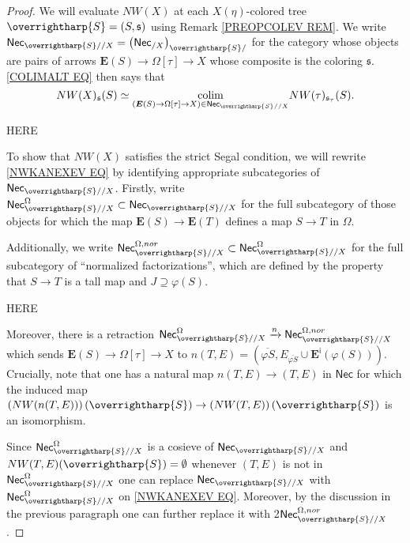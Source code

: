 \documentclass[a4paper,10pt
,draft
]{article}%
\numberwithin{equation}{section}
\numberwithin{figure}{section}
\theoremstyle{definition} %
\newcommand{\vect}[1]{\text{\overrightharp{\ensuremath{#1}}}}
\DeclareMathOperator{\colim}{colim}%
\newcommand{\1}{\ensuremath{\mathbbm 1}}%
\begin{document}
\begin{proof}
	We will evaluate 
	$NW(X)$ at each $X(\eta)$-colored tree
	$\vect{S}=(S,\mathfrak{s})$
	using Remark \ref{PREOPCOLEV REM}.
%	
	We write
	$\mathsf{Nec}_{\vect{S}//X}
	=
	\left(\mathsf{Nec}_{/X}\right)_{\vect{S}/}$
	for the category
	whose objects are pairs of arrows
	$\boldsymbol{E}(S) \to \Omega[\tau] \to X$
	whose composite is the coloring $\mathfrak{s}$.
	\eqref{COLIMALT EQ}
	then says that
\begin{equation}\label{NWKANEXEV EQ}
	NW(X)_{\mathfrak{s}}(S) 
	\simeq
	\underset{(\boldsymbol{E}(S) \to \Omega[\tau] \to X)
		\in \mathsf{Nec}_{\vect{S}//X}}{\colim}
	NW(\tau)_{\mathfrak{s}_{\tau}}(S).
\end{equation}

{\color{red} HERE}

	To show that $NW(X)$ satisfies the strict Segal condition, 
	we will rewrite \eqref{NWKANEXEV EQ} 
	by identifying appropriate subcategories of
	$\mathsf{Nec}_{\vect{S}//X}$.
	Firstly, write
	$\mathsf{Nec}_{\vect{S}//X}^{\Omega}
	\subset
	\mathsf{Nec}_{\vect{S}//X}$
	for the full subcategory of those objects for which the map
	$\boldsymbol{E}(S) \to \boldsymbol{E}(T)$
	defines a map $S \to T$ in $\Omega$.
	
	
	Additionally, we write 
	$
	\mathsf{Nec}_{\vect{S}//X}^{\Omega,nor}
	\subset
	\mathsf{Nec}_{\vect{S}//X}^{\Omega}
	$
	for the full subcategory of ``normalized factorizations'',
	which are defined by the property that
	$S \to T$ is a tall map and
	$J \supseteq \varphi(S)$.
	
{\color{red} HERE}	
	
	Moreover, there is a retraction
	$
	\mathsf{Nec}_{\vect{S}//X}^{\Omega}
	\xrightarrow{n}
	\mathsf{Nec}_{\vect{S}//X}^{\Omega,nor}
	$
	which sends
	$\boldsymbol{E}(S) \to \Omega[\tau] \to X$ to
	$n(T,E)=(\overline{\varphi S},
	E_{\overline{\varphi S}} \cup \boldsymbol{E}^{\mathsf{i}}(\varphi(S)))$.
	Crucially, note that one has a natural map
	$n(T,E) \to (T,E)$ in $\mathsf{Nec}$
	for which the induced map
	$\left(NW(n(T,E))\right)(\vect{S}) \to
	\left(NW(T,E)\right)(\vect{S})$
	is an isomorphism.
	
	Since 
	$\mathsf{Nec}_{\vect{S}//X}^{\Omega}$
	is a cosieve of 
	$\mathsf{Nec}_{\vect{S}//X}$
	and 
	$NW(T,E)(\vect{S}) = \emptyset$
	whenever $(T,E)$ is not in 
	$\mathsf{Nec}_{\vect{S}//X}^{\Omega}$
	one can replace 
	$\mathsf{Nec}_{\vect{S}//X}$
	with 
	$\mathsf{Nec}_{\vect{S}//X}^{\Omega}$
	on
	\eqref{NWKANEXEV EQ}.
	Moreover, by the discussion in the previous paragraph one can further replace it with
	2$\mathsf{Nec}_{\vect{S}//X}^{\Omega,nor}$.
	

\end{proof}
\end{document}
